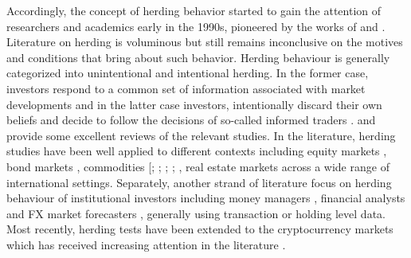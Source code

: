 \documentclass[
  letterpaper,
  DIV=11,
  numbers=noendperiod]{scrartcl}
\begin{document}
Accordingly, the concept of herding behavior started to gain the
attention of researchers and academics early in the 1990s, pioneered by
the works of \citet{banerjee1992simple} and
\citet{bikhchandani1992theory}. Literature on herding is voluminous but
still remains inconclusive on the motives and conditions that bring
about such behavior. Herding behaviour is generally categorized into
unintentional and intentional herding. In the former case, investors
respond to a common set of information associated with market
developments and in the latter case investors, intentionally discard
their own beliefs and decide to follow the decisions of so-called
informed traders \citep{bikchandani2000herd}. \citet{spyrou2013herding}
and \citet{komalasari2022herding} provide some excellent reviews of the
relevant studies. In the literature, herding studies have been well
applied to different contexts including equity markets \citep[see
\emph{interalia}][]{demirer2006does, chiang2010empirical, ukpong2021determinants},
bond markets \citep[see \emph{interalia}][]{galariotis2016herd},
commodities {[}\citet{demirer2015commodity}; \citet{babalos2015herding};
\citet{babalos2015commodity}; \citet{junior2020analyzing};
\citet{youssef2022oil}, real estate markets \citep[see
\emph{interalia}][]{philippas2013herding, lesame2024herding} across a
wide range of international settings. Separately, another strand of
literature focus on herding behaviour of institutional investors
including money managers \citep{jiang2018does}, financial analysts
\citep{leece2017effects} and FX market forecasters
\citep{tsuchiya2015herding}, generally using transaction or holding
level data. Most recently, herding tests have been extended to the
cryptocurrency markets which has received increasing attention in the
literature \citep[see \emph{interalia}][]{bouri2019herding}.
\end{document}
